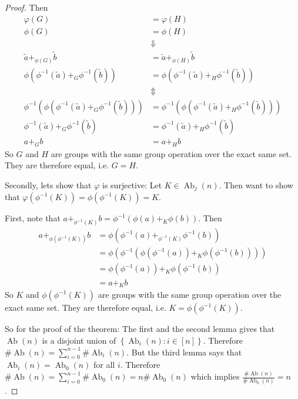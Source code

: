 \documentclass[a4paper, 12pt, english]{article}
\theoremstyle{plain}
\theoremstyle{definition}
\newcommand{\set}[1]{ \left\{ #1 \right\} } %
\DeclareMathOperator{\Ab}{Ab}
\begin{document}
\begin{proof}
    Then
    \begin{align*}
        \varphi(G) &= \varphi(H) \\
        \phi(G) &= \phi(H) \\
        &\Downarrow \\
        \tilde{a} +_{\phi(G)} \tilde{b} &= \tilde{a} +_{\phi(H)} \tilde{b} \\
        \phi(\phi^{-1}(\tilde{a}) +_G \phi^{-1}(\tilde{b})) &= \phi(\phi^{-1}(\tilde{a}) +_H \phi^{-1}(\tilde{b})) \\
        &\Updownarrow \\
        \phi^{-1}(\phi(\phi^{-1}(\tilde{a}) +_G \phi^{-1}(\tilde{b}))) &= \phi^{-1}(\phi(\phi^{-1}(\tilde{a}) +_H \phi^{-1}(\tilde{b}))) \\
        \phi^{-1}(\tilde{a}) +_G \phi^{-1}(\tilde{b}) &= \phi^{-1}(\tilde{a}) +_H \phi^{-1}(\tilde{b}) \\
        a +_G b &= a +_H b
    \end{align*}
    So \( G \) and \( H \) are groups with the same group operation over the exact same set. They are therefore equal, i.e. \( G = H \).

    Secondly, lets show that \( \varphi \) is surjective: Let \( K \in \Ab_j(n) \). Then want to show that \( \varphi(\phi^{-1}(K)) = \phi(\phi^{-1}(K)) = K \).

    First, note that \( a +_{\phi^{-1}(K)} b = \phi^{-1}(\phi(a) +_K \phi(b)) \). Then
    \begin{align*}
        a +_{\phi(\phi^{-1}(K))} b &= \phi(\phi^{-1}(a) +_{\phi^{-1}(K)} \phi^{-1}(b)) \\
        &= \phi(\phi^{-1}(\phi(\phi^{-1}(a)) +_K \phi(\phi^{-1}(b)) )) \\
        &= \phi(\phi^{-1}(a)) +_K \phi(\phi^{-1}(b)) \\
        &= a +_K b
    \end{align*}
    So \( K \) and \( \phi(\phi^{-1}(K)) \) are groups with the same group operation over the exact same set. They are therefore equal, i.e. \( K = \phi(\phi^{-1}(K)) \).

    So for the proof of the theorem: The first and the second lemma gives that \( \Ab(n) \) is a disjoint union of \( \set{\Ab_i(n) : i \in [n]} \). Therefore \( \#\Ab(n) = \sum_{i=0}^{n-1} \#\Ab_i(n) \). But the third lemma says that \( \Ab_i(n) = \Ab_0(n) \) for all \( i \). Therefore \( \#\Ab(n) = \sum_{i=0}^{n-1} \#\Ab_0(n) = n\#\Ab_0(n) \) which implies \( \frac{\#\Ab(n)}{\#\Ab_0(n)} = n \).
\end{proof}
\end{document}

